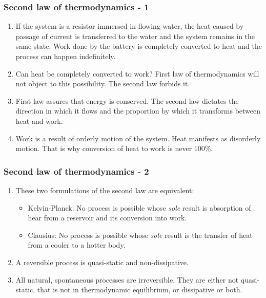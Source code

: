 \documentclass{beamer}
\begin{document}
\begin{frame}
\frametitle{Second law of thermodynamics - 1}
\begin{enumerate}
\item If the system is a resistor immersed in flowing water, the heat caused by passage of current is transferred to the water
and the system remains in the same state. Work done by the battery is completely converted to heat and the process can happen
indefinitely.
\item Can heat be completely converted to work? First law of thermodynamics will not object to this possibility. The second law 
forbids it.
\item  First law assures that energy is conserved. The second law dictates the direction in which it flows and the proportion
by which it transforms between heat and work.
\item Work is a result of orderly motion of the system. Heat manifests as disorderly motion. That is why conversion of heat
to work is never $100\%$.
\end{enumerate}
\end{frame}

\begin{frame}
\frametitle{Second law of thermodynamics - 2}
\begin{enumerate}
\item These two formulations of the second law are equivalent:
\begin{itemize}
\item  Kelvin-Planck: No process is possible whose \emph{sole} result is absorption of hear from a reservoir and its conversion
into work.
\item Clausius: No process is possible whose \emph{sole} result is the transfer of heat from a cooler to a hotter body.
\end{itemize}
\item A reversible process is quasi-static and non-dissipative.
\item All natural, spontaneous processes are irreversible. They are either not quasi-static, that is not in thermodynamic
equilibrium, or dissipative or both.
\end{enumerate}
\end{frame}
\end{document}
